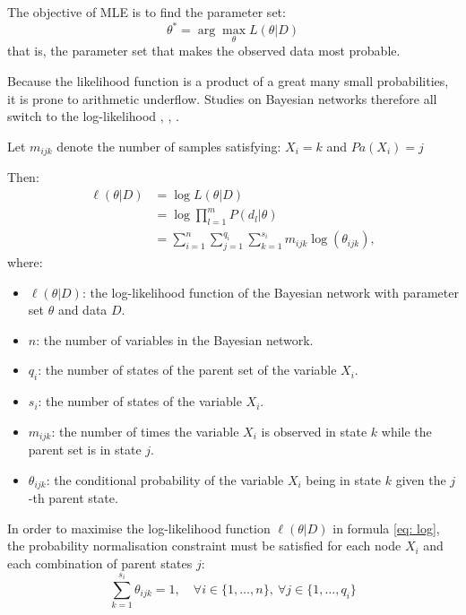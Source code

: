     
\vspace{1em}
\noindent
The objective of MLE is to find the parameter set:
$$\theta^* = \arg\max_{\theta} L(\theta|D)$$
that is, the parameter set that makes the observed data most probable.

\vspace{1em}

Because the likelihood function is a product of a great many small probabilities, it is prone to arithmetic underflow. Studies on Bayesian networks therefore all switch to the log-likelihood \cite{koller2009probabilistic}, \cite{darwiche2009modeling}, \cite{liu2024credit}.

\vspace{1em}
Let $m_{ijk}$ denote the number of samples satisfying: $X_i=k$ and $Pa(X_i)=j$ 

Then:
\begin{equation}
\begin{aligned}
\label{eq: log}
\ell(\theta|D) 
&= \log L(\theta|D) \\
&= \log \prod_{l=1}^{m} P(d_l|\theta) \\
&= \sum_{i=1}^{n} \sum_{j=1}^{q_i} \sum_{k=1}^{s_i}
m_{ijk} \log(\theta_{ijk}),
\end{aligned}
\end{equation}
where:
\begin{itemize}
    \item $\ell(\theta|D)$: the log-likelihood function of the Bayesian network with parameter set $\theta$ and data $D$.
    \item $n$: the number of variables in the Bayesian network.
    \item $q_i$: the number of states of the parent set of the variable $X_i$.
    \item $s_i$: the number of states of the variable $X_i$.
    \item $m_{ijk}$: the number of times the variable $X_i$ is observed in state $k$ while the parent set is in state $j$.
    \item $\theta_{ijk}$: the conditional probability of the variable $X_i$ being in state $k$ given the $j$-th parent state.
\end{itemize}

\vspace{1em}
In order to maximise the log-likelihood function $\ell(\theta|D)$ in formula \ref{eq: log}, the probability normalisation constraint must be satisfied for each node $X_i$ and each combination of parent states $j$:
\begin{equation}
    \sum_{k=1}^{s_i} \theta_{ijk} = 1, \quad \forall i \in \{1,\ldots,n\},\ \forall j \in \{1,\ldots,q_i\}
\end{equation}

